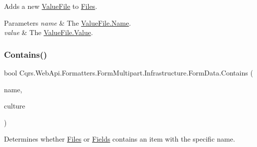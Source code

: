 Adds a new \hyperlink{classCqrs_1_1WebApi_1_1Formatters_1_1FormMultipart_1_1Infrastructure_1_1FormData_1_1ValueFile}{Value\+File} to \hyperlink{classCqrs_1_1WebApi_1_1Formatters_1_1FormMultipart_1_1Infrastructure_1_1FormData_a09da7b76f703fc20899051d9d9ed17b0_a09da7b76f703fc20899051d9d9ed17b0}{Files}. 


\begin{DoxyParams}{Parameters}
{\em name} & The \hyperlink{classCqrs_1_1WebApi_1_1Formatters_1_1FormMultipart_1_1Infrastructure_1_1FormData_1_1ValueFile_a2410547f01c8ae8c6d5dd70d3f92284c_a2410547f01c8ae8c6d5dd70d3f92284c}{Value\+File.\+Name}.\\
\hline
{\em value} & The \hyperlink{classCqrs_1_1WebApi_1_1Formatters_1_1FormMultipart_1_1Infrastructure_1_1FormData_1_1ValueFile_aebbbefbeda7233acb846f54aaa2f26c2_aebbbefbeda7233acb846f54aaa2f26c2}{Value\+File.\+Value}.\\
\hline
\end{DoxyParams}
\mbox{\label{classCqrs_1_1WebApi_1_1Formatters_1_1FormMultipart_1_1Infrastructure_1_1FormData_ae43d8a31fa56a669756b97724bf0703b_ae43d8a31fa56a669756b97724bf0703b}} 
\subsubsection{\texorpdfstring{Contains()}{Contains()}}
{\footnotesize\ttfamily bool Cqrs.\+Web\+Api.\+Formatters.\+Form\+Multipart.\+Infrastructure.\+Form\+Data.\+Contains (\begin{DoxyParamCaption}\item[{string}]{name,  }\item[{Culture\+Info}]{culture }\end{DoxyParamCaption})}



Determines whether \hyperlink{classCqrs_1_1WebApi_1_1Formatters_1_1FormMultipart_1_1Infrastructure_1_1FormData_a09da7b76f703fc20899051d9d9ed17b0_a09da7b76f703fc20899051d9d9ed17b0}{Files} or \hyperlink{classCqrs_1_1WebApi_1_1Formatters_1_1FormMultipart_1_1Infrastructure_1_1FormData_a91cfdcbb3a074aadee7e7fc228c04a6a_a91cfdcbb3a074aadee7e7fc228c04a6a}{Fields} contains an item with the specific name. 



